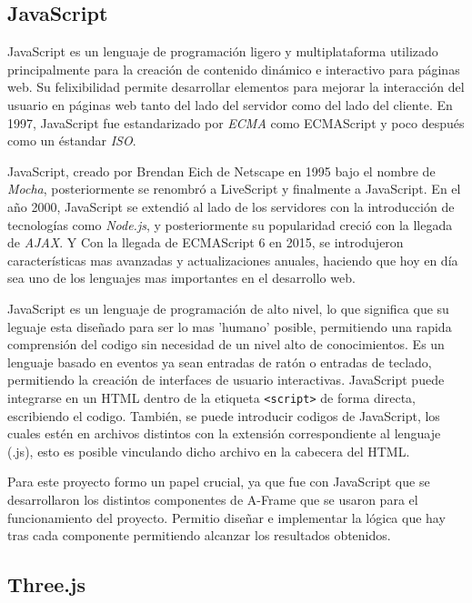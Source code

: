 \documentclass[a4paper, 12pt]{book}
\begin{document}
\subsection{JavaScript}
\label{subsec:JavaScript}
JavaScript es un lenguaje de programación ligero y multiplataforma utilizado principalmente para la creación de contenido dinámico e interactivo para páginas web.
Su felixibilidad permite desarrollar elementos para mejorar la interacción del usuario en páginas web tanto del lado del servidor como del lado del cliente. En 1997, JavaScript fue estandarizado
por \textit{ECMA} como ECMAScript y poco después como un éstandar \textit{ISO}.

JavaScript, creado por Brendan Eich de Netscape en 1995 bajo el nombre de \textit{Mocha}, posteriormente se renombró a LiveScript y finalmente a JavaScript.
En el año 2000, JavaScript se extendió al lado de los servidores con la introducción de tecnologías como \textit{Node.js}, y posteriormente su popularidad creció con la llegada de \textit{AJAX}. Y Con la llegada de ECMAScript 6 en 2015, se introdujeron características mas avanzadas y
actualizaciones anuales, haciendo que hoy en día sea uno de los lenguajes mas importantes en el desarrollo web.

JavaScript es un lenguaje de programación de alto nivel, lo que significa que su leguaje esta diseñado para ser lo mas 'humano' posible, permitiendo una rapida comprensión del codigo sin necesidad de un nivel alto de conocimientos.
Es un lenguaje basado en eventos ya sean entradas de ratón o entradas de teclado, permitiendo la creación de interfaces de usuario interactivas. JavaScript puede integrarse en un HTML dentro de la etiqueta \texttt{<script>} de forma directa, escribiendo el codigo.
También, se puede introducir codigos de JavaScript, los cuales estén en archivos distintos con la extensión correspondiente al lenguaje (.js), esto es posible vinculando dicho archivo en la cabecera del HTML.

Para este proyecto formo un papel crucial, ya que fue con JavaScript que se desarrollaron los distintos componentes de A-Frame que se usaron para el funcionamiento del proyecto. Permitio diseñar e implementar la lógica que hay tras cada componente permitiendo alcanzar los resultados obtenidos.

\subsection{Three.js}
\label{subsec:Threejs}
\end{document}
